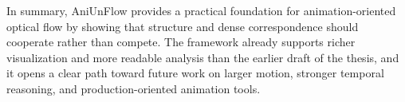 In summary, AniUnFlow provides a practical foundation for animation-oriented optical flow by showing that structure and dense correspondence should cooperate rather than compete. The framework already supports richer visualization and more readable analysis than the earlier draft of the thesis, and it opens a clear path toward future work on larger motion, stronger temporal reasoning, and production-oriented animation tools.
